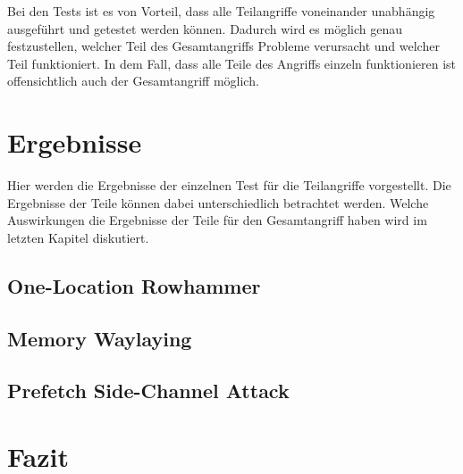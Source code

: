\documentclass[conference]{IEEEtran}
\begin{document}
Bei den Tests ist es von Vorteil, dass alle Teilangriffe voneinander unabhängig ausgeführt und getestet werden können. Dadurch wird es möglich genau festzustellen, welcher Teil des Gesamtangriffs Probleme verursacht und welcher Teil funktioniert. In dem Fall, dass alle Teile des Angriffs einzeln funktionieren ist offensichtlich auch der Gesamtangriff möglich.



\section{Ergebnisse}
Hier werden die Ergebnisse der einzelnen Test für die Teilangriffe vorgestellt. Die Ergebnisse der Teile können dabei unterschiedlich betrachtet werden. Welche Auswirkungen die Ergebnisse der Teile für den Gesamtangriff haben wird im letzten Kapitel diskutiert.

\subsection{One-Location Rowhammer}


\subsection{Memory Waylaying}


\subsection{Prefetch Side-Channel Attack}


\section{Fazit}





%
{}
%
\end{document}
